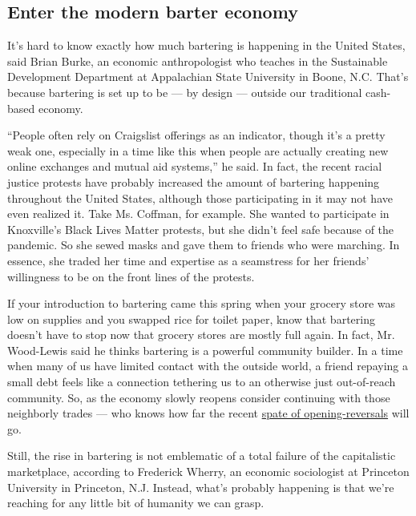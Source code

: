 \hypertarget{enter-the-modern-barter-economy}{%
\subsection{Enter the modern barter
economy}\label{enter-the-modern-barter-economy}}

It's hard to know exactly how much bartering is happening in the United
States, said Brian Burke, an economic anthropologist who teaches in the
Sustainable Development Department at Appalachian State University in
Boone, N.C. That's because bartering is set up to be --- by design ---
outside our traditional cash-based economy.

``People often rely on Craigslist offerings as an indicator, though it's
a pretty weak one, especially in a time like this when people are
actually creating new online exchanges and mutual aid systems,'' he
said. In fact, the recent racial justice protests have probably
increased the amount of bartering happening throughout the United
States, although those participating in it may not have even realized
it. Take Ms. Coffman, for example. She wanted to participate in
Knoxville's Black Lives Matter protests, but she didn't feel safe
because of the pandemic. So she sewed masks and gave them to friends who
were marching. In essence, she traded her time and expertise as a
seamstress for her friends' willingness to be on the front lines of the
protests.

If your introduction to bartering came this spring when your grocery
store was low on supplies and you swapped rice for toilet paper, know
that bartering doesn't have to stop now that grocery stores are mostly
full again. In fact, Mr. Wood-Lewis said he thinks bartering is a
powerful community builder. In a time when many of us have limited
contact with the outside world, a friend repaying a small debt feels
like a connection tethering us to an otherwise just out-of-reach
community. So, as the economy slowly reopens consider continuing with
those neighborly trades --- who knows how far the recent
\href{https://www.nytimes.com/interactive/2020/us/states-reopen-map-coronavirus.html}{spate
of opening-reversals} will go.

Still, the rise in bartering is not emblematic of a total failure of the
capitalistic marketplace, according to Frederick Wherry, an economic
sociologist at Princeton University in Princeton, N.J. Instead, what's
probably happening is that we're reaching for any little bit of humanity
we can grasp.

